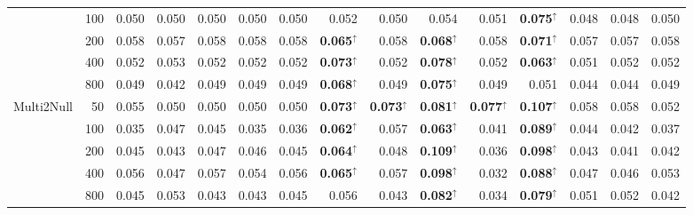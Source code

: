 \begin{tabular}{@{}lrrrrrrrrrrrrrr@{}}
 & 100 & 0.050 & 0.050 & 0.050 & 0.050 & 0.050 & 0.052 & 0.050 & 0.054 & 0.051 & \textbf{0.075}$^{\uparrow}$ & 0.048 & 0.048 & 0.050\\
 & 200 & 0.058 & 0.057 & 0.058 & 0.058 & 0.058 & \textbf{0.065}$^{\uparrow}$ & 0.058 & \textbf{0.068}$^{\uparrow}$ & 0.058 & \textbf{0.071}$^{\uparrow}$ & 0.057 & 0.057 & 0.058\\
 & 400 & 0.052 & 0.053 & 0.052 & 0.052 & 0.052 & \textbf{0.073}$^{\uparrow}$ & 0.052 & \textbf{0.078}$^{\uparrow}$ & 0.052 & \textbf{0.063}$^{\uparrow}$ & 0.051 & 0.052 & 0.052\\
 & 800 & 0.049 & 0.042 & 0.049 & 0.049 & 0.049 & \textbf{0.068}$^{\uparrow}$ & 0.049 & \textbf{0.075}$^{\uparrow}$ & 0.049 & 0.051 & 0.044 & 0.044 & 0.049\\
\addlinespace[2pt]
Multi2Null & 50 & 0.055 & 0.050 & 0.050 & 0.050 & 0.050 & \textbf{0.073}$^{\uparrow}$ & \textbf{0.073}$^{\uparrow}$ & \textbf{0.081}$^{\uparrow}$ & \textbf{0.077}$^{\uparrow}$ & \textbf{0.107}$^{\uparrow}$ & 0.058 & 0.058 & 0.052\\
 & 100 & 0.035 & 0.047 & 0.045 & 0.035 & 0.036 & \textbf{0.062}$^{\uparrow}$ & 0.057 & \textbf{0.063}$^{\uparrow}$ & 0.041 & \textbf{0.089}$^{\uparrow}$ & 0.044 & 0.042 & 0.037\\
 & 200 & 0.045 & 0.043 & 0.047 & 0.046 & 0.045 & \textbf{0.064}$^{\uparrow}$ & 0.048 & \textbf{0.109}$^{\uparrow}$ & 0.036 & \textbf{0.098}$^{\uparrow}$ & 0.043 & 0.041 & 0.042\\
 & 400 & 0.056 & 0.047 & 0.057 & 0.054 & 0.056 & \textbf{0.065}$^{\uparrow}$ & 0.057 & \textbf{0.098}$^{\uparrow}$ & 0.032 & \textbf{0.088}$^{\uparrow}$ & 0.047 & 0.046 & 0.053\\
 & 800 & 0.045 & 0.053 & 0.043 & 0.043 & 0.045 & 0.056 & 0.043 & \textbf{0.082}$^{\uparrow}$ & 0.034 & \textbf{0.079}$^{\uparrow}$ & 0.051 & 0.052 & 0.042\\
\bottomrule
\end{tabular}